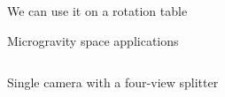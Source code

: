 \begin{frame}[label=app-22]{We can use it on a rotation table}
\end{frame}
    
    
    \begin{frame}[label=app-111]{Microgravity space applications}   
    \begin{columns}
    \end{columns}
    \end{frame}
    
    \begin{frame}[label=app-2b]{Single camera with a four-view splitter}
    \centering{}
    \end{frame}
    
